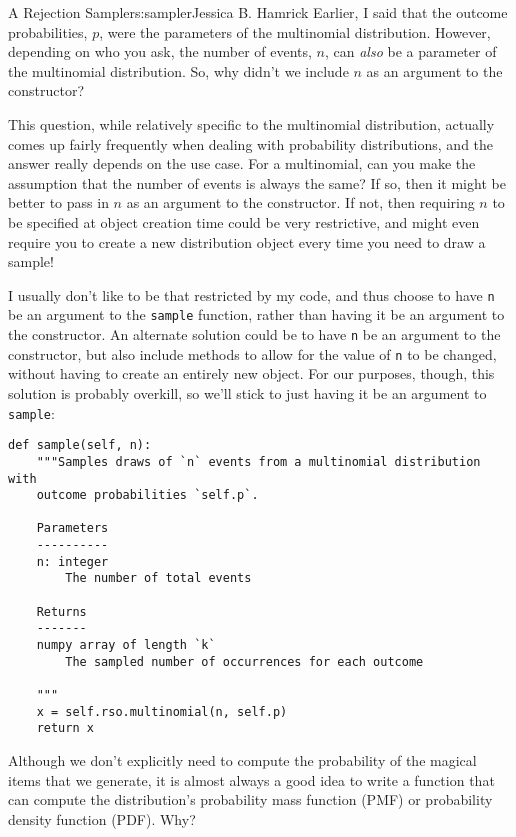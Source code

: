 \begin{aosachapter}{A Rejection Sampler}{s:sampler}{Jessica B. Hamrick}
Earlier, I said that the outcome probabilities, $p$, were the parameters
of the multinomial distribution. However, depending on who you ask, the
number of events, $n$, can \emph{also} be a parameter of the multinomial
distribution. So, why didn't we include $n$ as an argument to the
constructor?

This question, while relatively specific to the multinomial
distribution, actually comes up fairly frequently when dealing with
probability distributions, and the answer really depends on the use
case. For a multinomial, can you make the assumption that the number of
events is always the same? If so, then it might be better to pass in $n$
as an argument to the constructor. If not, then requiring $n$ to be
specified at object creation time could be very restrictive, and might
even require you to create a new distribution object every time you need
to draw a sample!

I usually don't like to be that restricted by my code, and thus choose
to have \texttt{n} be an argument to the \texttt{sample} function,
rather than having it be an argument to the constructor. An alternate
solution could be to have \texttt{n} be an argument to the constructor,
but also include methods to allow for the value of \texttt{n} to be
changed, without having to create an entirely new object. For our
purposes, though, this solution is probably overkill, so we'll stick to
just having it be an argument to \texttt{sample}:

\begin{verbatim}
def sample(self, n):
    """Samples draws of `n` events from a multinomial distribution with
    outcome probabilities `self.p`.

    Parameters
    ----------
    n: integer
        The number of total events

    Returns
    -------
    numpy array of length `k`
        The sampled number of occurrences for each outcome

    """
    x = self.rso.multinomial(n, self.p)
    return x
\end{verbatim}

\label{evaluating-the-multinomial-pmf}

Although we don't explicitly need to compute the probability of the
magical items that we generate, it is almost always a good idea to write
a function that can compute the distribution's probability mass function
(PMF) or probability density function (PDF). Why?


\end{aosachapter}
